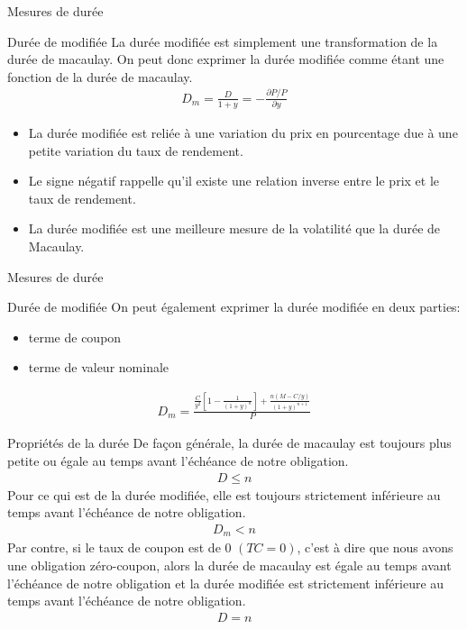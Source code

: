 \documentclass[11pt]{beamer}
\begin{document}
\begin{frame}{Mesures de durée}
\begin{block}{Durée de modifiée}
La durée modifiée est simplement une transformation de la durée de macaulay. On peut donc exprimer la durée modifiée comme étant une fonction de la durée de macaulay.
\begin{align*}
D_m=\frac{D}{1+y}=-\frac{\partial P/P}{\partial y}
\end{align*}
\begin{itemize}
\item La durée modifiée est reliée à une variation du prix en pourcentage due à une petite variation du taux de rendement.  
\item Le signe négatif rappelle qu’il existe une relation inverse entre le prix et le taux de rendement.  
\item La durée modifiée est une meilleure mesure de la volatilité que la durée de Macaulay. 
\end{itemize}
\end{block}
\end{frame}



\begin{frame}{Mesures de durée}
\begin{block}{Durée de modifiée}
On peut également exprimer la durée modifiée en deux parties:
\begin{itemize}
\item terme de coupon 
\item terme de valeur nominale
\end{itemize}
\begin{align*}
D_m=\frac{\frac{C}{y^2} \left[ 1-\frac{1}{(1+y)^n} \right]+\frac{n(M-C/y)}{(1+y)^{n+1}}}{P}
\end{align*}
\end{block}
\end{frame}

\begin{frame}{Propriétés de la durée}
De façon générale,  la durée de macaulay est toujours plus petite ou égale au temps avant l'échéance de notre obligation. 
\begin{align*}
D \le n
\end{align*}
Pour ce qui est de la durée modifiée, elle est toujours strictement inférieure au temps avant l'échéance de notre obligation. 
\begin{align*}
D_m < n 
\end{align*}
Par contre, si le taux de coupon est de 0 $(TC=0)$,  c'est à dire que nous avons une obligation zéro-coupon, alors la durée de macaulay  est égale au temps avant l'échéance de notre obligation et la durée modifiée est strictement inférieure au temps avant l'échéance de notre obligation.
\begin{align*}
D=n 
\end{align*}
\end{frame}
\end{document}
